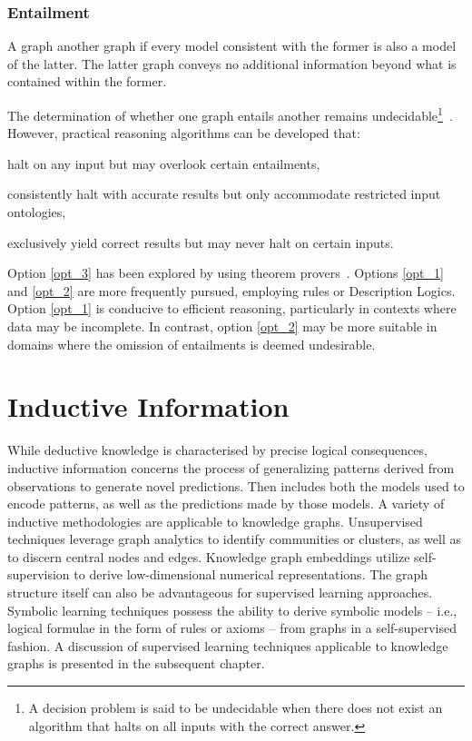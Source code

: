 \subsubsection{Entailment}
A graph  another graph if every model consistent with the former is also a model of the latter. The latter graph conveys no additional information beyond what is contained within the former.

The determination of whether one graph entails another remains undecidable\footnote{A decision problem is said to be undecidable when there does not exist an algorithm that halts on all inputs with the correct answer.}~\cite{Hitzler2010FoundationsSWTechnologies}. However, practical reasoning algorithms can be developed that:
\begin{enumerate*}[label=(\roman*),before=\unskip{ i.e., }, itemjoin={{, }}, itemjoin*={{, or }}]
    \item\label{opt_1} halt on any input but may overlook certain entailments,
    \item\label{opt_2} consistently halt with accurate results but only accommodate restricted input ontologies,
    \item\label{opt_3} exclusively yield correct results but may never halt on certain inputs.
\end{enumerate*}

Option \ref{opt_3} has been explored by using theorem provers~\cite{Schneider2011ReasoningOWL2Full}. Options \ref{opt_1} and \ref{opt_2} are more frequently pursued, employing rules or Description Logics. Option \ref{opt_1} is conducive to efficient reasoning, particularly in contexts where data may be incomplete. In contrast, option \ref{opt_2} may be more suitable in domains where the omission of entailments is deemed undesirable.

\section{Inductive Information}\label{inductive-information}
While deductive knowledge is characterised by precise logical consequences, inductive information concerns the process of generalizing patterns derived from observations to generate novel predictions. Then  includes both the models used to encode patterns, as well as the predictions made by those models.
A variety of inductive methodologies are applicable to knowledge graphs. Unsupervised techniques leverage graph analytics to identify communities or clusters, as well as to discern central nodes and edges. Knowledge graph embeddings utilize self-supervision to derive low-dimensional numerical representations. The graph structure itself can also be advantageous for supervised learning approaches. Symbolic learning techniques possess the ability to derive symbolic models – i.e., logical formulae in the form of rules or axioms – from graphs in a self-supervised fashion. A discussion of supervised learning techniques applicable to knowledge graphs is presented in the subsequent chapter.

